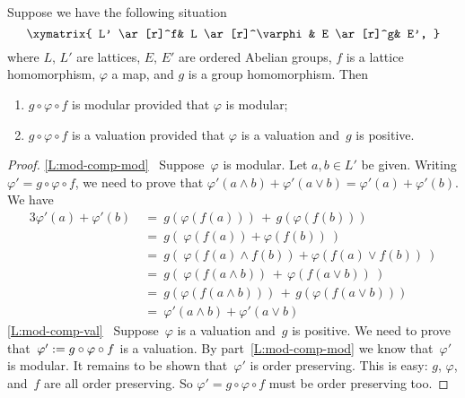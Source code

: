\documentclass[main.tex]{subfiles}
\begin{document}
\begin{lem}
\label{L:mod-comp}
Suppose we have the following situation
\begin{equation*}
\xymatrix{
L' \ar[r]^f&
L \ar[r]^\varphi&
E \ar[r]^g&
E',
}
\end{equation*}
where $L$, $L'$ are lattices,
$E$, $E'$ are ordered Abelian groups,
$f$ is a lattice homomorphism,
$\varphi$ a map,
and $g$ is a group homomorphism.
Then
\begin{enumerate}
\item
\label{L:mod-comp-mod}
$g\circ \varphi \circ f$ is modular
provided that $\varphi$ is modular;
\item
\label{L:mod-comp-val}
$g\circ \varphi \circ f$ is a valuation
provided that $\varphi$ is a valuation
and~$g$ is positive.
\end{enumerate}
\end{lem}
\begin{proof}
\noindent
\ref{L:mod-comp-mod}
\  Suppose~$\varphi$ is modular.
Let $a,b\in L'$ be given.
Writing $\varphi'= g\circ\varphi \circ f$,
we need to prove that
$\varphi'(a\wedge b)+\varphi'(a\vee b)=\varphi'(a)+\varphi'(b)$.
We have
\begin{alignat*}{3}
\varphi'(a) + \varphi'(b)
\ &=\ g(\varphi(f(a))) \,+\, g(\varphi(f(b))) \\
  &=\ g(\ \varphi( f(a)) + \varphi( f(b))\ ) \\
  &=\ g(\ \varphi(f(a)\wedge f(b)) + \varphi(f(a)\vee f(b))\ ) \\
  &=\ g(\  \varphi(f(a\wedge b)) \,+\, \varphi(f(a\vee b))\ ) \\
  &=\ g(\varphi(f(a\wedge b))) \,+\, g(\varphi(f(a\vee b))) \\ 
  &=\ \varphi'(a\wedge b) + \varphi'(a \vee b)
\end{alignat*}
\ref{L:mod-comp-val}
\  Suppose~$\varphi$ is a valuation
and~$g$ is positive.
We need to prove that~$\varphi':= g\circ \varphi\circ f$
is a valuation.
By part~\ref{L:mod-comp-mod}
we know that~$\varphi'$ is modular.
It remains to be shown that~$\varphi'$ is order preserving.
This is easy: $g$, $\varphi$, and~$f$ are all order preserving.
So $\varphi'=g\circ\varphi\circ f$ must be order preserving too.
\end{proof}
\end{document}
